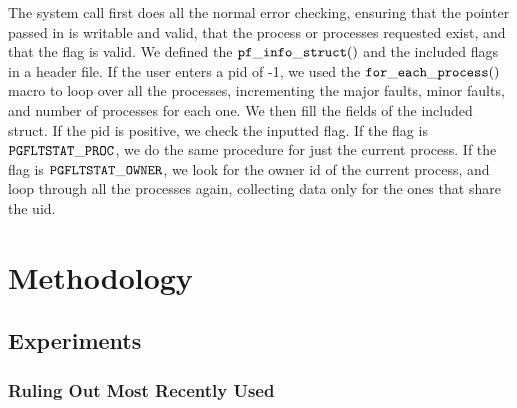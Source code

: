 \documentclass[twocolumn]{article}
\begin{document}
The system call first does all the normal error checking, ensuring that the pointer passed in is writable and valid, that the process or processes requested exist, and that the flag is valid. We defined the ${\tt pf\_info\_struct()}$ 
and the included flags in a header file.  If the user enters a pid of -1, we used the ${\tt for\_each\_process()}$ macro to loop over all the processes, incrementing the major faults, minor faults, and number of processes for each one. We then fill the fields of the included struct. If the pid is positive, we check the inputted flag. If the flag is ${\tt PGFLTSTAT\_PROC}$, we do the same procedure for just the current process. If the flag is ${\tt PGFLTSTAT\_OWNER}$, we look for the owner id of the current process, and loop through all the processes again, collecting data only for the ones that share the uid. 

\section{Methodology}
\subsection{Experiments}
\subsubsection{Ruling Out Most Recently Used}

\begin{figure}[h]
\end{figure}
\end{document}

